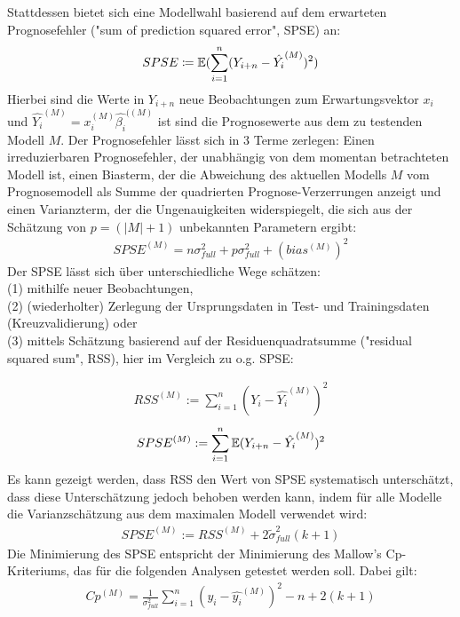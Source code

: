 	Stattdessen bietet sich eine Modellwahl basierend auf dem erwarteten Prognosefehler ("sum of prediction squared error", SPSE) an:
	\begin{align*}
		SPSE \coloneqq \operatorname{\mathbb{E}}(\sum_{i=1}^{n} (Y_{i+n} - \hat{Y_i}^{(M)})^2)
	\end{align*}
	Hierbei sind die Werte in $Y_{i+n}$ neue Beobachtungen zum Erwartungsvektor $x_i$ und $\hat{Y_i}^{(M)}  = x_{i}^{(M)}\hat{\beta_i}^{((M)}$ ist sind die Prognosewerte aus dem zu testenden Modell $M$.
	Der Prognosefehler lässt sich in 3 Terme zerlegen: Einen irreduzierbaren Prognosefehler, der unabhängig von dem momentan betrachteten Modell ist, einen Biasterm, der die Abweichung des aktuellen Modells $M$ vom Prognosemodell als Summe der quadrierten Prognose-Verzerrungen anzeigt und einen Varianzterm, der die Ungenauigkeiten widerspiegelt, die sich aus der Schätzung von $p = (|M|+1)$ unbekannten Parametern ergibt:
	\begin{align*}
	SPSE^{(M)} = n\sigma_{full}^2 + p\sigma_{full}^2 + (bias^{(M)})^2
	\end{align*}
	Der SPSE lässt sich über unterschiedliche Wege schätzen: \\(1) mithilfe neuer Beobachtungen, \\(2) (wiederholter) Zerlegung der Ursprungsdaten in Test- und Trainingsdaten (Kreuzvalidierung)  oder \\(3) mittels Schätzung basierend auf der Residuenquadratsumme ("residual squared sum", RSS), hier im Vergleich zu o.g. SPSE:

	\begin{align*}
	RSS^{(M)} := \sum_{i=1}^{n} (Y_{i} - \hat{Y_i}^{(M)})^2
	\end{align*}
	\begin{align*}
	SPSE^{(M)} := \sum_{i=1}^{n} \operatorname{\mathbb{E}} (Y_{i+n} - \hat{Y_i}^{(M)})^2
	\end{align*}
	Es kann gezeigt werden, dass RSS den Wert von SPSE systematisch unterschätzt, dass diese Unterschätzung jedoch behoben werden kann, indem für alle Modelle die Varianzschätzung aus dem maximalen Modell verwendet wird\cite{Schumacher.2019}:
	\begin{align*}
	SPSE^{(M)} := RSS^{(M)} + 2 \tilde{\sigma}_{full} ^2 (k+1)
	\end{align*}
	Die Minimierung des SPSE entspricht der Minimierung des Mallow's Cp- Kriteriums, das für die folgenden Analysen getestet werden soll. Dabei gilt:
	\begin{align*}
	Cp^{(M)} = \frac{1}{\sigma_{full}^2} \sum_{i=1}^{n} (y_i - \hat{y_i}^{(M)})^2 - n + 2(k+1)
	\end{align*}



